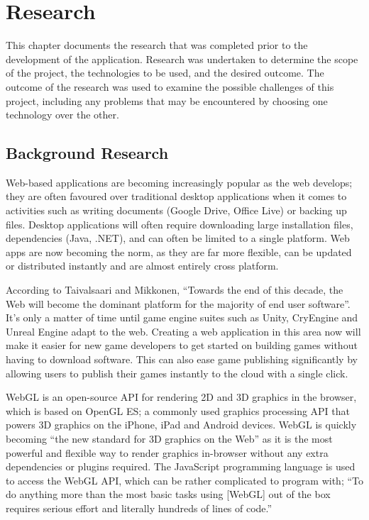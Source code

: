\chapter{Research}
\label{chapter:research}

This chapter documents the research that was completed prior to the development of the application. Research was undertaken to determine the scope of the project, the technologies to be used, and the desired outcome. The outcome of the research was used to examine the possible challenges of this project, including any problems that may be encountered by choosing one technology over the other.

\section{Background Research}
Web-based applications are becoming increasingly popular as the web develops; they are often favoured over traditional desktop applications when it comes to activities such as writing documents (Google Drive, Office Live) or backing up files.\cite{6068340} Desktop applications will often require downloading large installation files, dependencies (Java, .NET), and can often be limited to a single platform. Web apps are now becoming the norm, as they are far more flexible, can be updated or distributed instantly and are almost entirely cross platform.\cite{5936687}

According to Taivalsaari and Mikkonen, ``Towards the end of this decade, the Web will become the dominant platform for the majority of 
end user software''.\cite{6068340} It's only a matter of time until game engine suites such as Unity\cite{unity}, CryEngine\cite{cryengine} and Unreal Engine\cite{unreal} adapt to the web. Creating a web application in this area now will make it easier for new game developers to get started on building games without having to download software. This can also ease game publishing significantly by allowing users to publish their games instantly to the cloud with a single click.

WebGL is an open-source API for rendering 2D and 3D graphics in the browser, which is based on OpenGL ES; a commonly used graphics processing API that powers 3D graphics on the iPhone, iPad and Android devices.\cite{parisi2012webgl} WebGL is quickly becoming ``the new standard for 3D graphics on the Web''\cite[p2]{parisi2012webgl} as it is the most powerful and flexible way to render graphics in-browser without any extra dependencies or plugins required. The JavaScript programming language is used to access the WebGL API, which can be rather complicated to program with; ``To do anything more than the most basic tasks using [WebGL] out of the box requires serious effort and literally hundreds of lines of code.''\cite[p44]{parisi2014programming}

